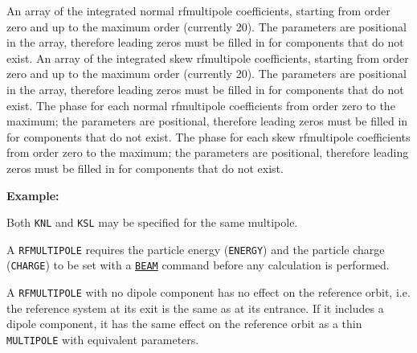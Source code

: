 \begin{madlist}
    An array of the integrated normal rfmultipole
     coefficients, starting from order zero and up to the maximum
     order (currently 20). 
     The parameters are positional in the array, therefore leading 
     zeros must be filled in for components that do not exist. 
    An array of the integrated skew rfmultipole
     coefficients, starting from order zero and up to the maximum
     order (currently 20). 
     The parameters are positional in the array, therefore leading 
     zeros must be filled in for components that do not exist. 
    The phase for each normal rfmultipole coefficients from
     order zero to the maximum; the parameters are positional,
     therefore leading zeros must be filled in for components that do not
     exist.  
    The phase for each skew rfmultipole coefficients from
     order zero to the maximum; the parameters are positional,
     therefore leading zeros must be filled in for components that do not
     exist.  
\end{madlist}


{\bf Example:}

Both {\tt KNL} and {\tt KSL} may be specified for the same multipole.  

A {\tt RFMULTIPOLE} requires the particle energy ({\tt ENERGY}) and the
particle charge ({\tt CHARGE}) to be set with a \hyperref[sec:beam]{\tt BEAM}
command before any calculation is performed. 


A {\tt RFMULTIPOLE} with no dipole component has no effect on the reference
orbit, i.e. the reference system at its exit is the same as at its
entrance. If it includes a dipole component, it has the same effect on
the reference orbit as a thin {\tt MULTIPOLE} with equivalent
parameters. 


